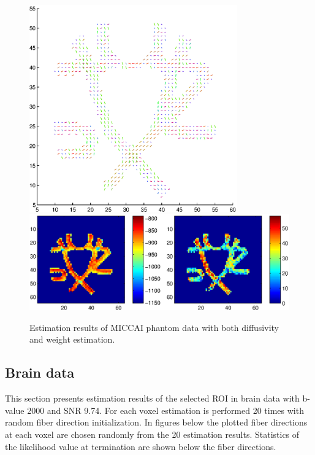 \documentclass{article}
\begin{document}
\begin{figure}[H]
  \caption{Estimation results of MICCAI phantom data with both diffusivity and weight estimation.}
  \centering
  \includegraphics[width=0.8\textwidth]{figures/phantom_bas_weights_diffus_dir.eps}
  \includegraphics[width=\textwidth]{figures/phantom_bas_weights_diffus_like.eps}
\end{figure}



\subsection{Brain data}

This section presents estimation results of the selected ROI in brain data with b-value 2000 and SNR 9.74. For each voxel estimation is performed 20 times with random fiber direction initialization. In figures below the plotted fiber directions at each voxel are chosen randomly from the 20 estimation results. Statistics of the likelihood value at termination are shown below the fiber directions.
\end{document}
